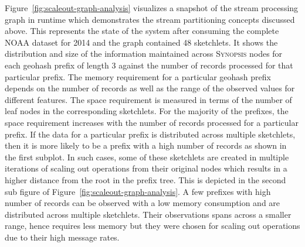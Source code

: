 Figure~\ref{fig:scaleout-graph-analysis} visualizes a snapshot of the stream processing graph in runtime which demonstrates the stream partitioning concepts discussed above. 
This represents the state of the system after consuming the complete NOAA dataset for 2014 and the graph contained 48 sketchlets. 
It shows the distribution and size of the information maintained across \textsc{Synopsis} nodes for each geohash prefix of length 3 against the number of records processed for that particular prefix.
The memory requirement for a particular geohash prefix depends on the number of records as well as the range of the observed values for different features.
The space requirement is measured in terms of the number of leaf nodes in the corresponding sketchlets.
For the majority of the prefixes, the space requirement increases with the number of records processed for a particular prefix.
If the data for a particular prefix is distributed across multiple sketchlets, then it is more likely to be a prefix with a high number of records as shown in the first subplot.
In such cases, some of these sketchlets are created in multiple iterations of scaling out operations from their original nodes which results in a higher distance from the root in the prefix tree. This is depicted in the second sub figure of Figure~\ref{fig:scaleout-graph-analysis}.
A few prefixes with high number of records can be observed with a low memory consumption and are distributed across multiple sketchlets.
Their observations spans across a smaller range, hence requires less memory but they were chosen for scaling out operations due to their high message rates. 



